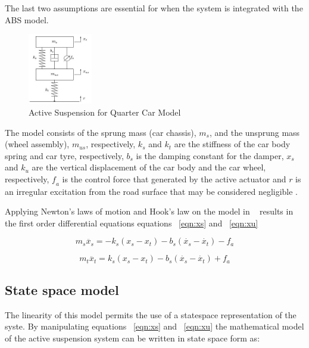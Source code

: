 \documentclass[10pt,twocolumn]{witseiepaper}
\begin{document}
The last two assumptions are essential for when the system is integrated with the ABS model.
 
\begin{figure}[ht]
	\centering
		\includegraphics[width=0.25\textwidth]{QuarterCarModel.jpg}
	\caption{ Active Suspension for Quarter Car Model}
	\label{fig:system}
\end{figure}

The model consists of the sprung mass (car chassis), $\textit{m}_{s}$, and the unsprung mass (wheel assembly), $\textit{m}_{us}$, respectively, $\textit{k}_{s}$ and $\textit{k}_{t}$ are the stiffness of the car body spring and car tyre, respectively, $\textit{b}_{s}$ is the damping constant for the damper, $\textit{x}_{s}$ and $\textit{k}_{u}$ are the vertical displacement of the car body and the car wheel, respectively, $\textit{f}_{a}$ is the control force that generated by the active actuator and $\textit{r}$ is an irregular excitation from the road surface that may be considered negligible \cite{Nyandoro:2011}. 

Applying Newton's laws of motion and Hook's law on the model in ~ results in the first order differential equations equations ~\ref{eqn:xs} and ~\ref{eqn:xu}

\begin{equation}
	m_s \ddot{x_s} = -k_s(x_s - x_t) - b_s(\dot{x_s} - \dot{x_t}) - f_a
	\label{eqn:xs}
\end{equation}

\begin{equation}
	m_t \ddot{x_t} = k_s(x_s - x_t) - b_s(\dot{x_s} - \dot{x_t}) + f_a
	\label{eqn:xu}
\end{equation}

\subsection{State space model}

The linearity of this model permits the use of a statespace representation of the syste. By manipulating equations ~\ref{eqn:xs} and ~\ref{eqn:xu} the mathematical model of the active suspension system can be written in
state space form as:
\end{document}
